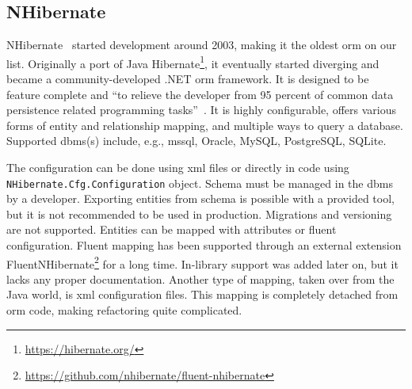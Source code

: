 \subsection{NHibernate}
\label{section:nhibernate}

NHibernate~\cite{nhibernate, nhibernateRepo} started development around 2003, making it the oldest \acrshort{orm} on our list. Originally a port of Java Hibernate\footnote{\url{https://hibernate.org/}}, it eventually started diverging and became a community-developed .NET \acrshort{orm} framework. It is designed to be feature complete and ``to relieve the developer from 95 percent of common data persistence related programming tasks''~\cite{nhibernate}. 
It is highly configurable, offers various forms of entity and relationship mapping, and multiple ways to query a database. Supported \acrshort{dbms}(s) include, e.g.,  \acrshort{mssql}, Oracle, MySQL, PostgreSQL, SQLite.

The configuration can be done using \acrshort{xml} files or directly in code using \texttt{NHibernate.Cfg.Configuration} object. 
Schema must be managed in the \acrshort{dbms} by a developer. Exporting entities from schema is possible with a provided tool, but it is not recommended to be used in production. Migrations and versioning are not supported. Entities can be mapped with attributes or fluent configuration. Fluent mapping has been supported through an external extension FluentNHibernate\footnote{\url{https://github.com/nhibernate/fluent-nhibernate}} for a long time. In-library support was added later on, but it lacks any proper documentation. Another type of mapping, taken over from the Java world, is \acrshort{xml} configuration files. This mapping is completely detached from \acrshort{orm} code, making refactoring quite complicated.

